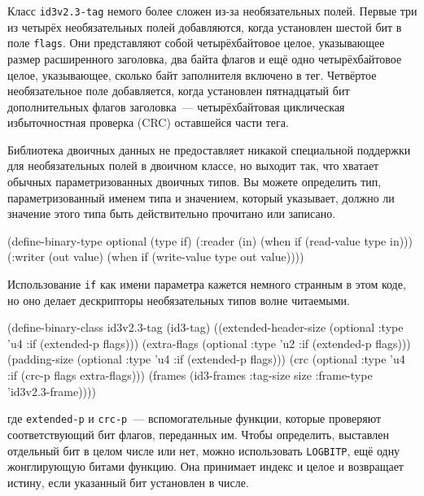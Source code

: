 Класс \lstinline{id3v2.3-tag} немого более сложен из-за необязательных полей. Первые три из
четырёх необязательных полей добавляются, когда установлен шестой бит в поле
\lstinline{flags}. Они представляют собой четырёхбайтовое целое, указывающее размер
расширенного заголовка, два байта флагов и ещё одно четырёхбайтовое целое, указывающее,
сколько байт заполнителя включено в тег. Четвёртое необязательное поле добавляется, когда установлен пятнадцатый
бит дополнительных флагов заголовка~--- четырёхбайтовая циклическая избыточностная проверка
(CRC) оставшейся части тега.

Библиотека двоичных данных не предоставляет никакой специальной поддержки для
необязательных полей в двоичном классе, но выходит так, что хватает обычных
параметризованных двоичных типов. Вы можете определить тип, параметризованный именем типа
и значением, который указывает, должно ли значение этого типа быть действительно
прочитано или записано.

\begin{myverb}
(define-binary-type optional (type if)
  (:reader (in)
    (when if (read-value type in)))
  (:writer (out value)
    (when if (write-value type out value))))
\end{myverb}

Использование \lstinline{if} как имени параметра кажется немного странным в этом коде, но оно
делает дескрипторы необязательных типов волне читаемыми.

\begin{myverb}
(define-binary-class id3v2.3-tag (id3-tag)
  ((extended-header-size (optional :type 'u4 :if (extended-p flags)))
   (extra-flags          (optional :type 'u2 :if (extended-p flags)))
   (padding-size         (optional :type 'u4 :if (extended-p flags)))
   (crc                  (optional :type 'u4 :if (crc-p flags extra-flags)))
   (frames               (id3-frames :tag-size size :frame-type 'id3v2.3-frame))))
\end{myverb}

\noindent{}где \lstinline{extended-p} и \lstinline{crc-p}~--- вспомогательные функции, которые проверяют
соответствующий бит флагов, переданных им. Чтобы определить, выставлен отдельный бит в
целом числе или нет, можно использовать \lstinline{LOGBITP}, ещё одну жонглирующую битами
функцию. Она принимает индекс и целое и возвращает истину, если указанный бит установлен в
числе.

